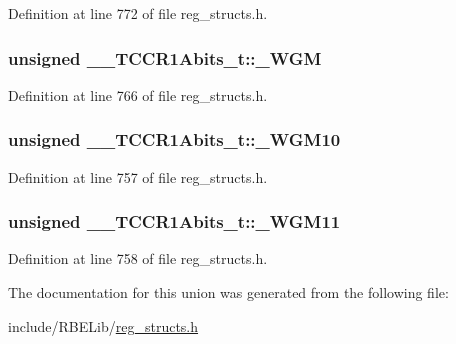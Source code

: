 Definition at line 772 of file reg\+\_\+structs.\+h.

\hypertarget{union_____t_c_c_r1_abits__t_aa9faf3e5a3dea9623ac8bed36fc9e888}{
\subsubsection[{\+\_\+\+W\+G\+M}]{\setlength{\rightskip}{0pt plus 5cm}unsigned \+\_\+\+\_\+\+T\+C\+C\+R1\+Abits\+\_\+t\+::\+\_\+\+W\+G\+M}}\label{union_____t_c_c_r1_abits__t_aa9faf3e5a3dea9623ac8bed36fc9e888}


Definition at line 766 of file reg\+\_\+structs.\+h.

\hypertarget{union_____t_c_c_r1_abits__t_add5c47895346d95c54b92a7f656536b3}{
\subsubsection[{\+\_\+\+W\+G\+M10}]{\setlength{\rightskip}{0pt plus 5cm}unsigned \+\_\+\+\_\+\+T\+C\+C\+R1\+Abits\+\_\+t\+::\+\_\+\+W\+G\+M10}}\label{union_____t_c_c_r1_abits__t_add5c47895346d95c54b92a7f656536b3}


Definition at line 757 of file reg\+\_\+structs.\+h.

\hypertarget{union_____t_c_c_r1_abits__t_a39ca1f337bf8f7399a40abbdea0fa677}{
\subsubsection[{\+\_\+\+W\+G\+M11}]{\setlength{\rightskip}{0pt plus 5cm}unsigned \+\_\+\+\_\+\+T\+C\+C\+R1\+Abits\+\_\+t\+::\+\_\+\+W\+G\+M11}}\label{union_____t_c_c_r1_abits__t_a39ca1f337bf8f7399a40abbdea0fa677}


Definition at line 758 of file reg\+\_\+structs.\+h.



The documentation for this union was generated from the following file\+:\begin{DoxyCompactItemize}
\item 
include/\+R\+B\+E\+Lib/\hyperlink{reg__structs_8h}{reg\+\_\+structs.\+h}\end{DoxyCompactItemize}
